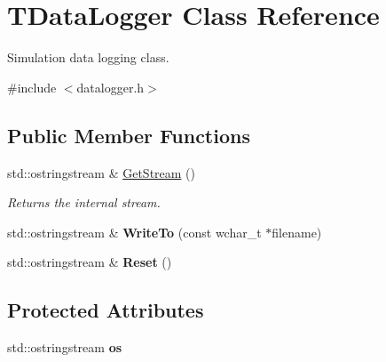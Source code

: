 \hypertarget{class_t_data_logger}{\section{T\+Data\+Logger Class Reference}
\label{class_t_data_logger}
}


Simulation data logging class.  




{\ttfamily \#include $<$datalogger.\+h$>$}

\subsection*{Public Member Functions}
\begin{DoxyCompactItemize}
\item 
\hypertarget{class_t_data_logger_aa858b1a2ebb24c593ffd447f54e34962}{std\+::ostringstream \& \hyperlink{class_t_data_logger_aa858b1a2ebb24c593ffd447f54e34962}{Get\+Stream} ()}\label{class_t_data_logger_aa858b1a2ebb24c593ffd447f54e34962}

\begin{DoxyCompactList}\small\item\em Returns the internal stream. \end{DoxyCompactList}\item 
\hypertarget{class_t_data_logger_a5f364699ffadaed989b8b0069fecbe6d}{std\+::ostringstream \& {\bfseries Write\+To} (const wchar\+\_\+t $\ast$filename)}\label{class_t_data_logger_a5f364699ffadaed989b8b0069fecbe6d}

\item 
\hypertarget{class_t_data_logger_a4a14dfd82f7839f7a87f471be754b2e5}{std\+::ostringstream \& {\bfseries Reset} ()}\label{class_t_data_logger_a4a14dfd82f7839f7a87f471be754b2e5}

\end{DoxyCompactItemize}
\subsection*{Protected Attributes}
\begin{DoxyCompactItemize}
\item 
\hypertarget{class_t_data_logger_a8e010eed75ef9fc31a3df855e056449e}{std\+::ostringstream {\bfseries os}}\label{class_t_data_logger_a8e010eed75ef9fc31a3df855e056449e}

\end{DoxyCompactItemize}
